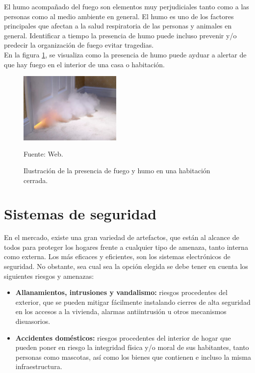 El humo acompañado del fuego son elementos muy perjudiciales tanto como a las personas como al medio ambiente en general. El humo es uno de los factores principales que afectan a la salud respiratoria de las personas y animales en general. Identificar a tiempo la presencia de humo puede incluso prevenir y/o predecir la organización de fuego  evitar tragedias.\\

En la figura \ref{fig:humo}, se visualiza como la presencia de humo puede ayduar a alertar de que hay fuego en el interior de una casa o habitación.\\

\begin{figure}[H]
    \begin{center}
        \includegraphics[width=5cm]{img/capitulo_3/fuego_en_el_cuarto.jpg}
    \end{center}
    \begin{center}
        \caption{Ilustración de la presencia de fuego y humo en una habitación cerrada.}
        Fuente: Web.
        \label{fig:humo}
    \end{center}
\end{figure}

\section{Sistemas de seguridad}
En el mercado, existe una gran variedad de artefactos, que están al alcance de todos para proteger los hogares frente a cualquier tipo de amenaza, tanto interna como externa. Los más eficaces y eficientes, son los sistemas electrónicos de seguridad. No obstante, sea cual sea la opción elegida se debe tener en cuenta los siguientes riesgos y amenazas:\\

\begin{itemize}
    \item \textbf{Allanamientos, intrusiones y vandalismo:} riesgos procedentes del exterior, que se pueden mitigar fácilmente instalando cierres de alta seguridad en los accesos a la vivienda, alarmas antiintrusión u otros mecanismos disuasorios.
    \item \textbf{Accidentes domésticos:} riesgos procedentes del interior de hogar que pueden poner en riesgo la integridad física y/o moral de sus habitantes, tanto personas como mascotas, así como los bienes que contienen e incluso la misma infraestructura.
\end{itemize}

